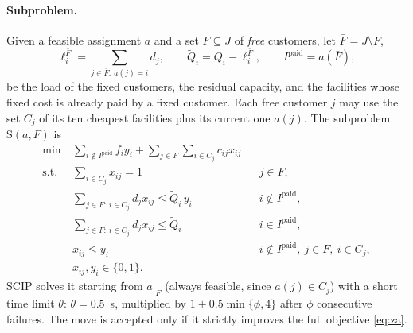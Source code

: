 \paragraph{Subproblem.} Given a feasible assignment $a$ and a set $F\subseteq J$ of \emph{free}
customers, let $\bar F=J\setminus F$,
\begin{equation}\label{eq:resid}
\ell^{\bar F}_i=\sum_{j\in\bar F:\ a(j)=i}d_j,\qquad
\tilde Q_i=Q_i-\ell^{\bar F}_i,\qquad
I^{\mathrm{paid}}=a(\bar F),
\end{equation}
be the load of the fixed customers, the residual capacity, and the facilities whose fixed cost is
already paid by a fixed customer. Each free customer $j$ may use the set $C_j$ of its ten cheapest
facilities plus its current one $a(j)$. The subproblem $\mathrm{S}(a,F)$ is
\begin{align}
\min\ & \sum_{i\notin I^{\mathrm{paid}}} f_i y_i+\sum_{j\in F}\sum_{i\in C_j} c_{ij}x_{ij}
\label{eq:subobj}\\
\text{s.t.}\ & \sum_{i\in C_j}x_{ij}=1 && j\in F, \nonumber\\
& \sum_{j\in F:\ i\in C_j} d_jx_{ij}\le \tilde Q_i\,y_i && i\notin I^{\mathrm{paid}}, \nonumber\\
& \sum_{j\in F:\ i\in C_j} d_jx_{ij}\le \tilde Q_i && i\in I^{\mathrm{paid}}, \nonumber\\
& x_{ij}\le y_i && i\notin I^{\mathrm{paid}},\ j\in F,\ i\in C_j, \nonumber\\
& x_{ij},y_i\in\{0,1\}. \nonumber
\end{align}
SCIP solves it starting from $a|_F$ (always feasible, since $a(j)\in C_j$) with a short time limit
$\theta$: $\theta=0.5$~s, multiplied by $1+0.5\min\{\phi,4\}$ after $\phi$ consecutive failures.
The move is accepted only if it strictly improves the full objective \eqref{eq:za}.

